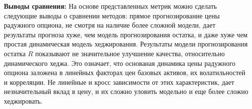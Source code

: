 \textbf{Выводы сравнения:} На основе представленных метрик 
можно сделать следующие выводы о сравнении методов: прямое прогнозирование цены радужного опциона, не смотря 
на наличие более сложной модели, дает результаты прогноза хуже, чем модель прогнозирования остатка, и даже хуже 
чем простая динамическая модель хеджирования. 
Результаты модели прогнозирования остатка $R$ показывают не значительное 
улучшение качества, относительно динамического хеджа. Это означает, что основаная динамика цены радужного опциона заложена 
в линейных факторах цен базовых активов, их волатильностей и корреляции. Не линейные и кросс зависимости от этих характеристик, дает 
незначительный вклад в цену, и их сложно уловить модельно и еще более сложно хеджировать.



